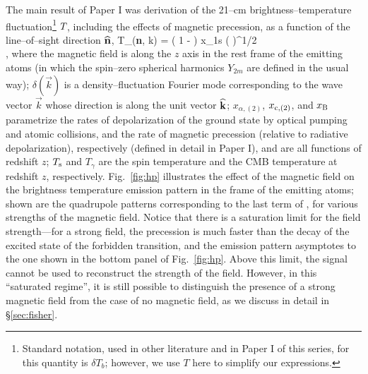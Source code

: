 The main result of Paper I was derivation of the 21--cm brightness--temperature fluctuation\footnote{Standard notation, used in other literature and in Paper I of this series, for this quantity is $\delta T_b$; however, we use $T$ here to simplify our expressions.} $T_{\rm }$, including the effects of magnetic precession, as a function of the line--of--sight direction ${\bf{\widehat n}}$, 
\beq
\bga
   T_{\rm }({\bf{\widehat n}}, {{\vec k}}) = \left( 1 -  \right) x_{1{\rm s}} \left(  \right)^{1/2} \\
  \times {} \mbox{,} 
\ega
\label{eq:tbsoln}
\eeq
where the magnetic field is along the $z$ axis in the rest frame of the emitting atoms (in which the spin--zero spherical harmonics $Y_{2 m}$ are defined in the usual way); $\delta(\vec k)$ is a density--fluctuation Fourier mode corresponding to the wave vector $\vec k$ whose direction is along the unit vector $\bf{\widehat k}$; $x_{\alpha, (2)}$, $x_{{\rm c}, (2)}$, and $x_{\rm B}$ parametrize the rates of depolarization of the ground state by optical pumping and atomic collisions, and the rate of magnetic precession (relative to radiative depolarization), respectively (defined in detail in Paper I), and are all functions of redshift $z$; $T_{\rm s}$ and $T_\gamma$ are the spin temperature and the CMB temperature at redshift $z$, respectively. Fig.~\ref{fig:hp} illustrates the effect of the magnetic field on the brightness temperature emission pattern in the frame of the emitting atoms; shown are the quadrupole patterns corresponding to the last term of \eq{\ref{eq:tbsoln}}, for various strengths of the magnetic field. Notice that there is a saturation limit for the field strength---for a strong field, the precession is much faster than the decay of the excited state of the forbidden transition, and the emission pattern asymptotes to the one shown in the bottom panel of Fig.~\ref{fig:hp}. Above this limit, the signal cannot be used to reconstruct the strength of the field. However, in this ``saturated regime'', it is still possible to distinguish the presence of a strong magnetic field from the case of no magnetic field, as we discuss in detail in \S\ref{sec:fisher}.
